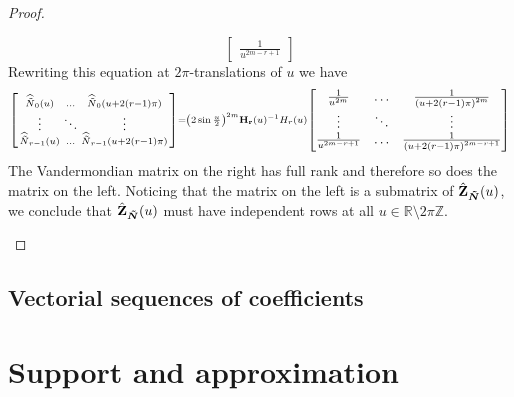 \begin{proof}
\begin{enumerate}
\begin{equation*}
\begin{bmatrix}
      \frac{1}{u^{2m-r+1}} \end{bmatrix}
    \end{equation*}
    Rewriting this equation at $2\pi$-translations of $u$ we have
    \begin{equation*}\scriptstyle
      \begin{bsmallmatrix} \widehat{\tilde{N}}_0(u) & \hdots & \widehat{\tilde{N}}_0(u+2(r-1)\pi)  \\ \vdots & \ddots & 
      \vdots \\ \widehat{\tilde{N}}_{r-1}(u) & \hdots & \widehat{\tilde{N}}_{r-1}(u + 2(r-1)\pi) \end{bsmallmatrix} = 
      \left(2\sin \frac{u}{2}\right)^{2m} {\mathbf{H_r}(u)}^{-1} H_r(u) \begin{bmatrix} \frac{1}{u^{2m}} & \hdots &  
      \frac{1}{{(u+2(r-1)\pi)}^{2m}} \\ \vdots & \ddots & \vdots \\ \frac{1}{u^{2m-r+1}} & \hdots & 
    \frac{1}{{(u+2(r-1)\pi)}^{2m-r+1}} \end{bmatrix}
    \end{equation*}
    The Vandermondian matrix on the right has full rank and therefore so does the matrix on the left. Noticing that the 
    matrix on the left is a submatrix of $\hat{\mathbf{Z}}_{\bm{\tilde{N}}}(u)$,  we conclude that 
    $\hat{\mathbf{Z}}_{\bm{\tilde{N}}}(u)$ must have independent rows at all $u \in \mathbb{R}\setminus{2\pi\mathbb{Z}}$.
  \end{enumerate}
\end{proof}

\subsection{Vectorial sequences of coefficients}

\section{Support and approximation}

